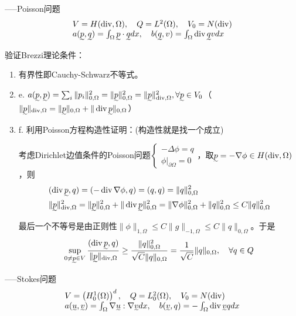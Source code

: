 -----Poisson问题
\[
  \begin{array}{l}
    V = H(\operatorname{div}, \Omega), \quad Q = L^2(\Omega), \quad V_0 = N(\operatorname{div})\\
    a(\undertilde{p}, \undertilde{q})=\int_{\Omega} \undertilde{p} \cdot \undertilde{q} dx, \quad b(\undertilde{q}, v)=\int_{\Omega} \operatorname{div} \undertilde{q} v dx
  \end{array}
\]

验证Brezzi理论条件：
\begin{enumerate}
  \item 有界性即Cauchy-Schwarz不等式。
  \item e. $a(\undertilde{p}, \undertilde{p}) = \sum_i\|p_i\|_{0, \Omega}^2 = \|\undertilde{p}\|_{0, \Omega}^2 = \|\undertilde{p}\|_{\operatorname{div}, \Omega}^2, \forall \undertilde{p} \in V_0$（$\|\undertilde{p}\|_{\operatorname{div}, \Omega} = \|\undertilde{p}\|_{0, \Omega} + \|\operatorname{div} \undertilde{p}\|_{0, \Omega}$）
  \item f. 利用Poisson方程构造性证明：(构造性就是找一个成立)
  
  考虑Dirichlet边值条件的Poisson问题$\left\{\begin{array}{l}
    -\Delta \phi=q \\
    \phi|_{\partial \Omega}=0
  \end{array}\right.$，取$\undertilde{p} = - \nabla \phi \in H(\operatorname{div}, \Omega)$，则
  \[
    \begin{aligned}
      &(\operatorname{div} \undertilde{p}, q)=(-\operatorname{div} \nabla \phi, q)=(q, q)=\|q\|_{0, \Omega}^{2}\\
      &\|\undertilde{p}\|_{\operatorname{div}, \Omega}^{2}=\|\undertilde{p}\|_{0, \Omega}^{2}+\|\operatorname{div} \undertilde{p}\|_{0, \Omega}^{2}=\|\nabla \phi\|_{0, \Omega}^{2}+\|q\|_{0, \Omega}^{2} \leq C\|q\|_{0, \Omega}^{2} 
    \end{aligned}
  \]

  最后一个不等号是由正则性$\|\phi\|_{1, \Omega} \leq C\|g\|_{-1, \Omega} \leq C\|q\|_{0, \Omega}$。于是
  \[
    \sup_{0 \neq \undertilde{p} \in V} \frac{(\operatorname{div} \undertilde{p}, q)}{\|\undertilde{p}\|_{\operatorname{div}, \Omega}} \ge \frac{\|q\|_{0, \Omega}^2}{\sqrt{C}\|q\|_{0, \Omega}} = \frac{1}{\sqrt{C}}\|q\|_{0, \Omega}, \quad \forall q \in Q
  \]
\end{enumerate}

-----Stokes问题
\[
  \begin{array}{l}
    V = \left(H_0^1(\Omega)\right)^d, \quad Q = L_0^2(\Omega), \quad V_0 = N(\operatorname{div})\\
    a(\undertilde{u}, \undertilde{v})=\int_{\Omega} \nabla \undertilde{u}: \nabla \undertilde{v} dx, \quad b(\undertilde{v}, q)=-\int_{\Omega} \operatorname{div} \undertilde{v} q dx
  \end{array}
\]

